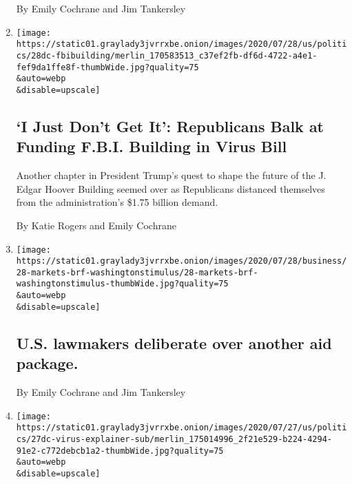\begin{enumerate}
  By Emily Cochrane and Jim Tankersley
\item
  \href{/2020/07/28/us/politics/republicans-trump-fbi-building-virus-relief-bill.html}{}

  \texttt{[image: https://static01.graylady3jvrrxbe.onion/images/2020/07/28/us/politics/28dc-fbibuilding/merlin\_170583513\_c37ef2fb-df6d-4722-a4e1-fef9da1ffe8f-thumbWide.jpg?quality=75\\\&auto=webp\\\&disable=upscale]}

  \hypertarget{i-just-dont-get-it-republicans-balk-at-funding-fbi-building-in-virus-bill}{%
  \subsection{`I Just Don't Get It': Republicans Balk at Funding F.B.I.
  Building in Virus
  Bill}\label{i-just-dont-get-it-republicans-balk-at-funding-fbi-building-in-virus-bill}}

  Another chapter in President Trump's quest to shape the future of the
  J. Edgar Hoover Building seemed over as Republicans distanced
  themselves from the administration's \$1.75 billion demand.

  By Katie Rogers and Emily Cochrane
\item
  \href{/2020/07/28/business/us-lawmakers-deliberate-over-another-aid-package.html}{}

  \texttt{[image: https://static01.graylady3jvrrxbe.onion/images/2020/07/28/business/28-markets-brf-washingtonstimulus/28-markets-brf-washingtonstimulus-thumbWide.jpg?quality=75\\\&auto=webp\\\&disable=upscale]}

  \hypertarget{us-lawmakers-deliberate-over-another-aid-package}{%
  \subsection{U.S. lawmakers deliberate over another aid
  package.}\label{us-lawmakers-deliberate-over-another-aid-package}}

  By Emily Cochrane and Jim Tankersley
\item
  \href{/2020/07/28/us/politics/coronavirus-relief-bills-house-senate.html}{}

  \texttt{[image: https://static01.graylady3jvrrxbe.onion/images/2020/07/27/us/politics/27dc-virus-explainer-sub/merlin\_175014996\_2f21e529-b224-4294-91e2-c772debcb1a2-thumbWide.jpg?quality=75\\\&auto=webp\\\&disable=upscale]}

  \hypertarget{here-are-the-differences-between-the-house-and-senate-coronavirus-relief-bills}{%
}
\end{enumerate}
